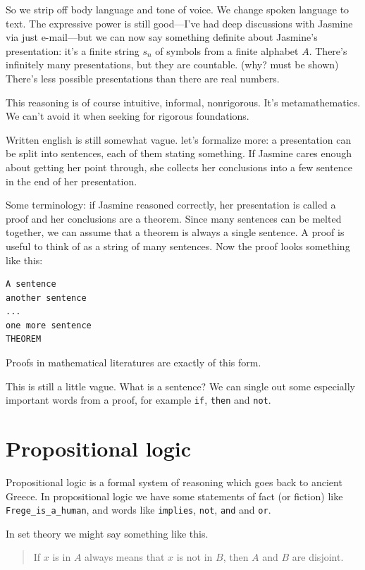 \documentclass[11pt,oneside,%
]{memoir}
\theoremstyle{definition}
\begin{document}
So we strip off body language and tone of voice. We change spoken language to text. The expressive power is still good---I've had deep discussions with Jasmine via just e-mail---but we can now say something definite about Jasmine's presentation: it's a finite string \(s_n\) of symbols from a finite alphabet \(A\). There's infinitely many presentations, but they are countable. (why? must be shown) There's less possible presentations than there are real numbers.

This reasoning is of course intuitive, informal, nonrigorous. It's metamathematics. We can't avoid it when seeking for rigorous foundations.

Written english is still somewhat vague. let's formalize more: a presentation can be split into sentences, each of them stating something. If Jasmine cares enough about getting her point through, she collects her conclusions into a few sentence in the end of her presentation.

Some terminology: if Jasmine reasoned correctly, her presentation is called a proof and her conclusions are a theorem. Since many sentences can be melted together, we can assume that a theorem is always a single sentence. A proof is useful to think of as a string of many sentences. Now the proof looks something like this:
\begin{lstlisting}
A sentence
another sentence
...
one more sentence
THEOREM
\end{lstlisting}
Proofs in mathematical literatures are exactly of this form.

This is still a little vague. What is a sentence? We can single out some especially important words from a proof, for example \lstinline!if!, \lstinline!then! and \lstinline!not!.

\section{Propositional logic}

Propositional logic is a formal system of reasoning which goes back to ancient Greece. In propositional logic we have some statements of fact (or fiction) like \lstinline!Frege_is_a_human!, and words like \lstinline!implies!, \lstinline!not!, \lstinline!and! and \lstinline!or!.

In set theory we might say something like this.
\begin{quote}
    If \(x\) is in \(A\) always means that \(x\) is not in \(B\), then \(A\) and \(B\) are disjoint.
\end{quote}%
\end{document}
